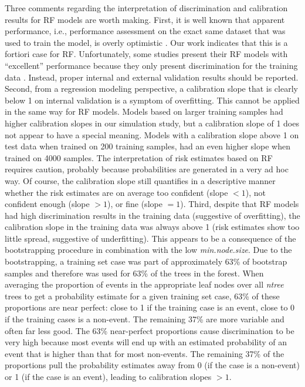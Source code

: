 Three comments regarding the interpretation of discrimination and calibration
results for \gls{RF} models are worth making. First, it is well known that apparent
performance, i.e., performance assessment on the exact same dataset that was
used to train the model, is overly optimistic
 \cite{altmanWhatWeMean2000,moonsPROBASTToolAssess2019}. Our work indicates that
this is a fortiori case for \gls{RF}. Unfortunately, some studies present their \gls{RF}
models with ``excellent'' performance because they only present discrimination
for the training data
 \cite{daiUsingRandomForest2018,chenPredictionMalignantMiddle2015,yuanDevelopmentHeartFailure2019}.
Instead, proper internal and external validation results should be reported.
Second, from a regression modeling perspective, a calibration slope that is
clearly below 1 on internal validation is a symptom of overfitting. This cannot
be applied in the same way for \gls{RF} models. Models based on larger training
samples had higher calibration slopes in our simulation study, but a calibration
slope of 1 does not appear to have a special meaning. Models with a calibration
slope above 1 on test data when trained on 200 training samples, had an even
higher slope when trained on 4000 samples. The interpretation of risk estimates
based on \gls{RF} requires caution, probably because probabilities are generated in a
very ad hoc way. Of course, the calibration slope still quantifies in a
descriptive manner whether the risk estimates are on average too confident
(slope $< 1$), not confident enough (slope $> 1$), or fine (slope $= 1$).
Third, despite that \gls{RF} models had high discrimination results in the training
data (suggestive of overfitting), the calibration slope in the training data was
always above 1 (risk estimates show too little spread, suggestive of
underfitting). This appears to be a consequence of the bootstrapping procedure
in combination with the low \textit{min.node.size}. Due to the bootstrapping, a
training set case was part of approximately 63\% of bootstrap samples and
therefore was used for 63\% of the trees in the forest. When averaging the
proportion of events in the appropriate leaf nodes over all \textit{ntree} trees
to get a probability estimate for a given training set case, 63\% of these
proportions are near perfect: close to 1 if the training case is an event,
close to 0 if the training cases is a non-event. The remaining 37\% are more
variable and often far less good. The 63\% near-perfect proportions cause
discrimination to be very high because most events will end up with an estimated
probability of an event that is higher than that for most non-events. The
remaining 37\% of the proportions pull the probability estimates away from 0 (if
the case is a non-event) or 1 (if the case is an event), leading to calibration
slopes $> 1$.

